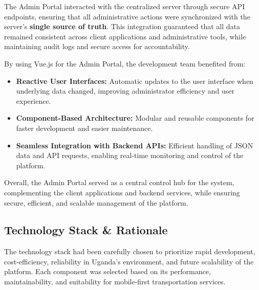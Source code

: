 The Admin Portal interacted with the centralized server through secure API
endpoints, ensuring that all administrative actions were synchronized with the
server’s \textbf{single source of truth}. This integration guaranteed that all
data remained consistent across client applications and administrative tools,
while maintaining audit logs and secure access for accountability.


By using Vue.js for the Admin Portal, the development team benefited from:


\begin{itemize}
 \item \textbf{Reactive User Interfaces:} Automatic updates to the user
        interface when underlying data changed, improving administrator
        efficiency and user experience.

 \item \textbf{Component-Based Architecture:} Modular and reusable
        components for faster development and easier maintenance.

 \item \textbf{Seamless Integration with Backend APIs:} Efficient
        handling of JSON data and API requests, enabling real-time monitoring
        and control of the platform.
\end{itemize}

Overall, the Admin Portal served as a central control hub for the system,
complementing the client applications and backend services, while ensuring
secure, efficient, and scalable management of the platform.


\subsection{Technology Stack \& Rationale}

The technology stack had been carefully chosen to prioritize rapid development,
cost-efficiency, reliability in Uganda’s environment, and future scalability of
the platform. Each component was selected based on its performance,
maintainability, and suitability for mobile-first transportation services.


